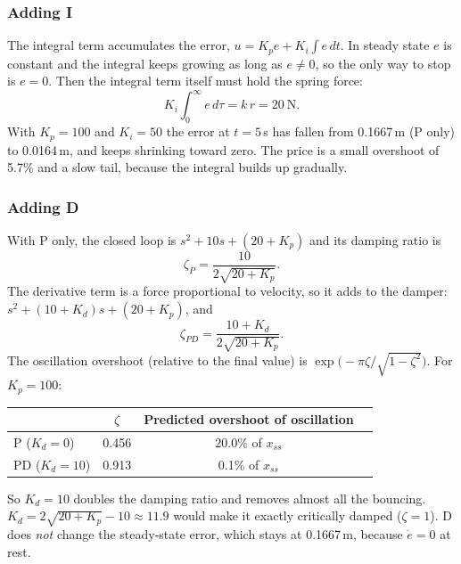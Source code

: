 \documentclass[]{article}
\begin{document}
\subsubsection{Adding I}

The integral term accumulates the error, $u = K_p e + K_i\int e\,dt$. In steady state $e$ is constant and the integral keeps growing as long as $e \neq 0$, so the only way to stop is $e = 0$. Then the integral term itself must hold the spring force:
\begin{equation}
	K_i \int_0^{\infty} e\, d\tau = k\,r = 20\ \text{N}.
\end{equation}
With $K_p = 100$ and $K_i = 50$ the error at $t=5$\,s has fallen from 0.1667\,m (P only) to 0.0164\,m, and keeps shrinking toward zero. The price is a small overshoot of 5.7\% and a slow tail, because the integral builds up gradually.

\subsubsection{Adding D}

With P only, the closed loop is $s^2 + 10s + (20+K_p)$ and its damping ratio is
\begin{equation}
	\zeta_P = \frac{10}{2\sqrt{20 + K_p}} .
\end{equation}
The derivative term is a force proportional to velocity, so it adds to the damper: $s^2 + (10+K_d)s + (20+K_p)$, and
\begin{equation}
	\zeta_{PD} = \frac{10 + K_d}{2\sqrt{20 + K_p}} .
\end{equation}
The oscillation overshoot (relative to the final value) is $\exp\!\bigl(-\pi\zeta/\sqrt{1-\zeta^2}\bigr)$. For $K_p = 100$:
\begin{center}
	\begin{tabular}{@{}lccc@{}}
		\toprule
		& $\zeta$ & Predicted overshoot of oscillation \\
		\midrule
		P ($K_d=0$)   & 0.456 & 20.0\% of $x_{ss}$ \\
		PD ($K_d=10$) & 0.913 & 0.1\% of $x_{ss}$ \\
		\bottomrule
	\end{tabular}
\end{center}
So $K_d = 10$ doubles the damping ratio and removes almost all the bouncing. $K_d = 2\sqrt{20+K_p} - 10 \approx 11.9$ would make it exactly critically damped ($\zeta=1$). D does \emph{not} change the steady-state error, which stays at 0.1667\,m, because $\dot{e}=0$ at rest.
\end{document}
